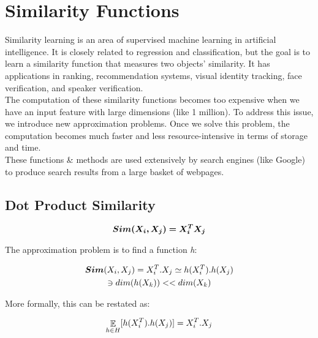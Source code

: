 \documentclass[12pt]{article}
\newcommand{\Simi}{\boldsymbol{Sim}}
\begin{document}
	\MakeScribeTop


\section{Similarity Functions}

Similarity learning is an area of supervised machine learning in artificial intelligence. It is closely related to regression and classification, but the goal is to learn a similarity function that measures two objects' similarity. It has applications in ranking, recommendation systems, visual identity tracking, face verification, and speaker verification. \\

The computation of these similarity functions becomes too expensive when we have an input feature with large dimensions (like 1 million). To address this issue, we introduce new approximation problems. Once we solve this problem, the computation becomes much faster and less resource-intensive in terms of storage and time. \\

These functions \& methods are used extensively by search engines (like Google) to produce search results from a large basket of webpages. 

\subsection{Dot Product Similarity}

\begin{equation}
    \boldsymbol{Sim (X_i,X_j) = X_i^T X_j} \notag
\end{equation}

\noindent The approximation problem is to find a function \textit{h}:

\vspace{-18pt}
\begin{gather}
    \Simi (X_i,X_j) = X_i^T.X_j \simeq h(X_i^T).h(X_j) \notag\\ 
    \ni dim(h(X_k)) << dim(X_k) \notag
\end{gather}

\noindent More formally, this can be restated as:

\begin{equation}
    \mathop{\mathbb{E}}_{h \in H}[h(X_i^T).h(X_j)] = X_i^T.X_j \notag
\end{equation}
\end{document}
